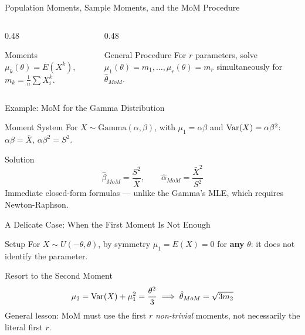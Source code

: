 \documentclass[aspectratio=169,xcolor={dvipsnames,table}]{beamer}
\begin{document}
\begin{frame}{Population Moments, Sample Moments, and the MoM Procedure}
	\vspace{-0.15cm}
	\begin{columns}[T]
		\begin{column}{0.48\textwidth}
			\begin{block}{Moments}
				\footnotesize
				$\mu_k(\theta) = E(X^k)$, $m_k = \frac{1}{n}\sum X_i^k$.
			\end{block}
		\end{column}
		\begin{column}{0.48\textwidth}
			\begin{alertblock}{General Procedure}
				\footnotesize
				For $r$ parameters, solve $\mu_1(\theta)=m_1, \ldots, \mu_r(\theta)=m_r$ simultaneously for $\hat\theta_{MoM}$.
			\end{alertblock}
		\end{column}
	\end{columns}
\end{frame}

\begin{frame}{Example: MoM for the Gamma Distribution}
	\vspace{-0.15cm}
	\begin{block}{Moment System}
		For $X\sim\text{Gamma}(\alpha,\beta)$, with $\mu_1=\alpha\beta$ and $\operatorname{Var}(X)=\alpha\beta^2$: $\alpha\beta=\bar X$, $\alpha\beta^2=S^2$.
	\end{block}
	\pause
	\vspace{0.1cm}
	\begin{alertblock}{Solution}
		$$\hat\beta_{MoM} = \frac{S^2}{\bar X}, \qquad \hat\alpha_{MoM} = \frac{\bar X^2}{S^2}$$
		Immediate closed-form formulas --- unlike the Gamma's MLE, which requires Newton-Raphson.
	\end{alertblock}
\end{frame}

\begin{frame}{A Delicate Case: When the First Moment Is Not Enough}
	\vspace{-0.15cm}
	\begin{block}{Setup}
		For $X\sim U(-\theta,\theta)$, by symmetry $\mu_1=E(X)=0$ for \textbf{any} $\theta$: it does not identify the parameter.
	\end{block}
	\pause
	\vspace{0.1cm}
	\begin{alertblock}{Resort to the Second Moment}
		$$\mu_2 = \operatorname{Var}(X)+\mu_1^2 = \frac{\theta^2}{3} \implies \hat\theta_{MoM} = \sqrt{3m_2}$$
		General lesson: MoM must use the first $r$ \emph{non-trivial} moments, not necessarily the literal first $r$.
	\end{alertblock}
\end{frame}
\end{document}
